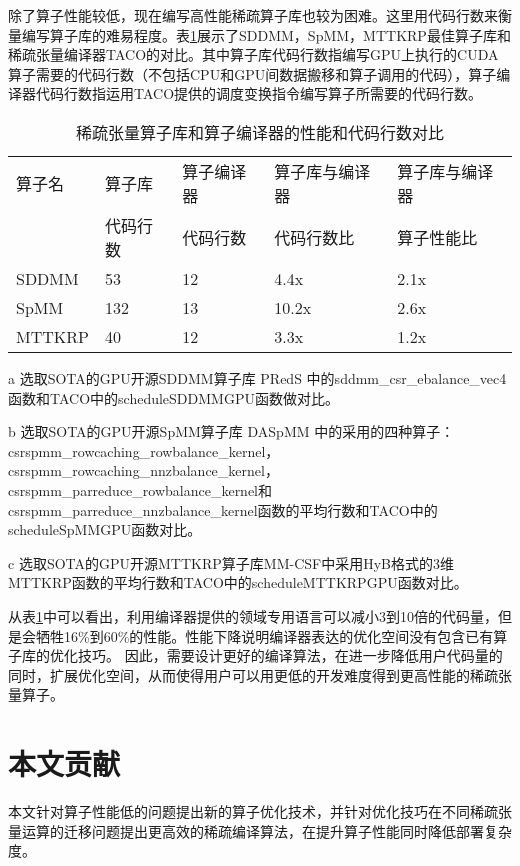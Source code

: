 除了算子性能较低，现在编写高性能稀疏算子库也较为困难。这里用代码行数来衡量编写算子库的难易程度。表\ref{tab:motivation-2}展示了SDDMM，SpMM，MTTKRP最佳算子库和稀疏张量编译器TACO的对比。其中算子库代码行数指编写GPU上执行的CUDA算子需要的代码行数（不包括CPU和GPU间数据搬移和算子调用的代码），算子编译器代码行数指运用TACO提供的调度变换指令编写算子所需要的代码行数。
\begin{table}
  \centering
  \begin{threeparttable}[c]
  \caption{稀疏张量算子库和算子编译器的性能和代码行数对比}
  \label{tab:motivation-2}
  \begin{tabular}{lllll}
    \toprule
    算子名  & 算子库 & 算子编译器 & 算子库与编译器 & 算子库与编译器   \\
           & 代码行数 & 代码行数 & 代码行数比    & 算子性能比       \\
    \midrule
    SDDMM\tnote{a}  & 53 & 12 & 4.4x & 2.1x \\
    SpMM\tnote{b}   & 132 & 13 & 10.2x & 2.6x \\
    MTTKRP\tnote{c} & 40 & 12 & 3.3x & 1.2x \\
    \bottomrule
  \end{tabular}
  \begin{tablenotes}
    \item [a] 选取SOTA的GPU开源SDDMM算子库 PRedS \cite{yu2021exploiting}中的sddmm\_csr\_ebalance\_vec4函数和TACO中的scheduleSDDMMGPU函数做对比。
    \item [b] 选取SOTA的GPU开源SpMM算子库 DASpMM \cite{dai2022heuristic}中的采用的四种算子：csrspmm\_rowcaching\_rowbalance\_kernel，
      csrspmm\_rowcaching\_nnzbalance\_kernel，csrspmm\_parreduce\_rowbalance\_kernel和csrspmm\_parreduce\_nnzbalance\_kernel函数的平均行数和TACO中的scheduleSpMMGPU函数对比。
    \item [c] 选取SOTA的GPU开源MTTKRP算子库MM-CSF\cite{nisa2019mttkrp}中采用HyB格式的3维MTTKRP函数的平均行数和TACO中的scheduleMTTKRPGPU函数对比。
  \end{tablenotes}
  \end{threeparttable}
\end{table}
从表\ref{tab:motivation-2}中可以看出，利用编译器提供的领域专用语言可以减小3到10倍的代码量，但是会牺牲16\%到60\%的性能。性能下降说明编译器表达的优化空间没有包含已有算子库的优化技巧。
因此，需要设计更好的编译算法，在进一步降低用户代码量的同时，扩展优化空间，从而使得用户可以用更低的开发难度得到更高性能的稀疏张量算子。

\section{本文贡献}
本文针对算子性能低的问题提出新的算子优化技术，并针对优化技巧在不同稀疏张量运算的迁移问题提出更高效的稀疏编译算法，在提升算子性能同时降低部署复杂度。

